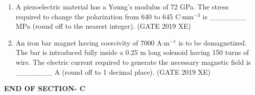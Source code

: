 \documentclass[journal,12pt,onecolumn]{IEEEtran}
\begin{document}
\begin{enumerate}
\item A piezoelectric material has a Young's modulus of 72 GPa. The stress required to change the polarization from 640 to 645 C$\cdot$mm$^{-3}$ is \_\_\_\_\_\_\_ MPa (round off to the nearest integer).
\hfill{(GATE 2019 XE)} \\


\item An iron bar magnet having coercivity of 7000 A$\cdot$m$^{-1}$ is to be demagnetized. The bar is introduced fully inside a 0.25 m long solenoid having 150 turns of wire. The electric current required to generate the necessary magnetic field is \_\_\_\_\_\_\_ A (round off to 1 decimal place).
\hfill{(GATE 2019 XE)} \\

\end{enumerate}

\begin{center}
    \item[\textbf{END OF SECTION- C}]
\end{center}


\newpage
\end{document}
